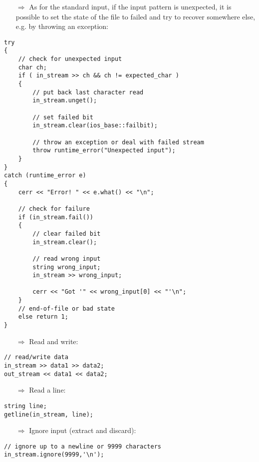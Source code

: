 \documentclass[10pt]{article}
\begin{document}
\begin{enumerate}
\item[$\Rightarrow$] As for the standard input, if the input pattern is unexpected, it is possible to set the state of the file to failed
and try to recover somewhere else, e.g. by throwing an exception:
\end{enumerate}
\begin{lstlisting}
try
{
    // check for unexpected input
    char ch;
    if ( in_stream >> ch && ch != expected_char )
    {
        // put back last character read
        in_stream.unget();
        
        // set failed bit
        in_stream.clear(ios_base::failbit);
    
        // throw an exception or deal with failed stream
        throw runtime_error("Unexpected input");
    }
}
catch (runtime_error e)
{
    cerr << "Error! " << e.what() << "\n";
            
    // check for failure
    if (in_stream.fail())
    {
        // clear failed bit
        in_stream.clear();
                
        // read wrong input
        string wrong_input;
        in_stream >> wrong_input;
                    
        cerr << "Got '" << wrong_input[0] << "'\n";
    }
    // end-of-file or bad state
    else return 1;
}
\end{lstlisting}
\begin{enumerate}
\item[$\Rightarrow$] Read and write:
\end{enumerate}
\begin{lstlisting}
// read/write data
in_stream >> data1 >> data2;
out_stream << data1 << data2;
\end{lstlisting}
\begin{enumerate}
\item[$\Rightarrow$] Read a line:
\end{enumerate}
\begin{lstlisting}
string line;
getline(in_stream, line);
\end{lstlisting}
\begin{enumerate}
\item[$\Rightarrow$] Ignore input (extract and discard):
\end{enumerate}
\begin{lstlisting}
// ignore up to a newline or 9999 characters
in_stream.ignore(9999,'\n');
\end{lstlisting}
\end{document}
